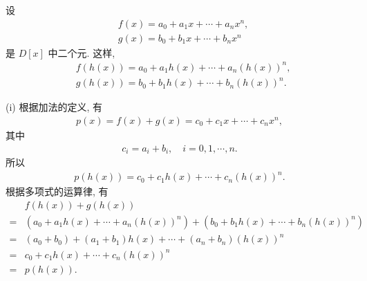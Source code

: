 \begin{pf}
    设
    \begin{align*}
         & f(x) = a_0 + a_1 x + \cdots + a_n x^n, \\
         & g(x) = b_0 + b_1 x + \cdots + b_n x^n
    \end{align*}
    是 $D[x]$ 中二个元. 这样,
    \begin{align*}
         & f(h(x)) = a_0 + a_1 h(x) + \cdots + a_n (h(x))^n, \\
         & g(h(x)) = b_0 + b_1 h(x) + \cdots + b_n (h(x))^n.
    \end{align*}

    (i) 根据加法的定义, 有
    \begin{align*}
        p(x) = f(x) + g(x) = c_0 + c_1 x + \cdots + c_n x^n,
    \end{align*}
    其中
    \begin{align*}
        c_i = a_i + b_i, \quad i = 0,1,\cdots,n.
    \end{align*}
    所以
    \begin{align*}
        p(h(x)) = c_0 + c_1 h(x) + \cdots + c_n (h(x))^n.
    \end{align*}
    根据多项式的运算律, 有
    \begin{align*}
             & f(h(x)) + g(h(x))                                                                   \\
        = {} & (a_0 + a_1 h(x) + \cdots + a_n (h(x))^n) + (b_0 + b_1 h(x) + \cdots + b_n (h(x))^n) \\
        = {} & (a_0 + b_0) + (a_1 + b_1) h(x) + \cdots + (a_n + b_n) (h(x))^n                      \\
        = {} & c_0 + c_1 h(x) + \cdots + c_n (h(x))^n                                              \\
        = {} & p(h(x)).
    \end{align*}


\end{pf}
